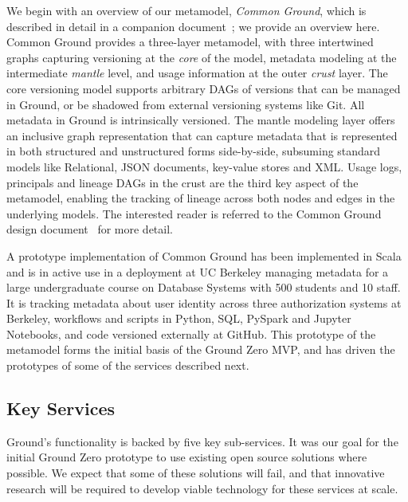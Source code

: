 We begin with an overview of our metamodel, \emph{Common Ground}, which is described in detail in a companion document~\cite{ground-metamodel}; we provide an overview here.  Common Ground provides a three-layer metamodel, with three intertwined graphs capturing versioning at the \emph{core} of the model, metadata modeling at the intermediate \emph{mantle} level, and usage information at the outer \emph{crust} layer.  The core versioning model supports arbitrary DAGs of versions that can be managed in Ground, or be shadowed from external versioning systems like Git. All metadata in Ground is intrinsically versioned. The mantle modeling layer offers an inclusive graph representation that can capture metadata that is represented in both structured and unstructured forms side-by-side, subsuming standard models like Relational, JSON documents, key-value stores and XML.  Usage logs, principals and lineage DAGs in the crust are the third key aspect of the metamodel, enabling the tracking of lineage across both nodes and edges in the underlying models.  The interested reader is referred to the Common Ground design document~\cite{ground-metamodel} for more detail.

A prototype implementation of Common Ground has been implemented in Scala and is in active use in a deployment at UC Berkeley managing metadata for a large undergraduate course on Database Systems with 500 students and 10 staff. It is tracking metadata about user identity across three authorization systems at Berkeley, workflows and scripts in Python, SQL, PySpark and Jupyter Notebooks, and code versioned externally at GitHub.  This prototype of the metamodel forms the initial basis of the Ground Zero MVP, and has driven the prototypes of some of the services described next.

\subsection{Key Services}
Ground's functionality is backed by five key sub-services.  It was our goal for the initial Ground Zero prototype to use existing open source solutions where possible.  We expect that some of these solutions will fail, and that innovative research will be required to develop viable technology for these services at scale.

